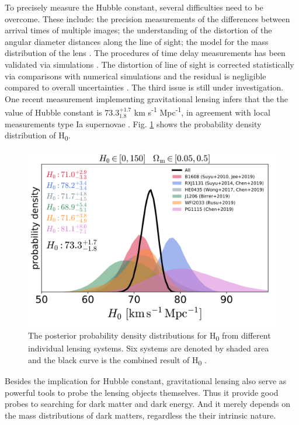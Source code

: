 \documentclass[letter,12pt]{article}
\begin{document}
To precisely measure the Hubble constant, several difficulties need
to be overcome. These include: the precision measurements of the
differences between arrival times of multiple images; the
understanding of the distortion of the angular diameter distances
along the line of sight; the model for the mass distribution of the
lens \citep{Birrer2020}. The procedures of time delay measurements has
been validated via simulations \citep{2015ApJ_799_168D}. The
distortion of line of sight is corrected statistically via
comparisons with numerical simulations \citep{2011MNRAS_410_2167F} and
the residual is negligible compared to overall uncertainties
\citep{Millon_2020}. The third issue is still under investigation. One
recent measurement implementing gravitational lensing infers that
the the value of Hubble constant is \(73.3^{+1.7}_{1.8}\) km s\textsuperscript{-1}
Mpc\textsuperscript{-1}, in agreement with local measurements type Ia supernovae
\citep{Wong2019}. Fig. \ref{fig:orgc7a4d76} shows the probability density
distribution of H\textsubscript{0}.

\begin{figure}[htbp]
\centering
\includegraphics[width=.9\linewidth]{./figures/H0WongEtAl.png}
\caption{\label{fig:orgc7a4d76}The posterior probability density distributions for H\textsubscript{0} from different individual lensing systems. Six systems are denoted by shaded area and the black curve is the combined result of H\textsubscript{0} \citep{Wong2019}.}
\end{figure}

Besides the implication for Hubble constant, gravitational lensing
also serve as powerful tools to probe the lensing objects
themselves. Thus it provide good probes to searching for dark matter
and dark energy. And it merely depends on the mass distributions of
dark matters, regardless the their intrinsic nature.
\end{document}
